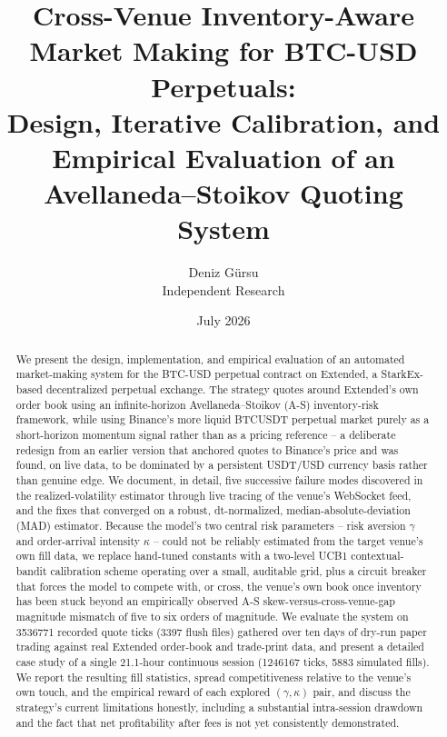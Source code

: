 \documentclass[11pt,a4paper]{article}
\title{\textbf{Cross-Venue Inventory-Aware Market Making for BTC-USD Perpetuals:\\
Design, Iterative Calibration, and Empirical Evaluation of an\\
Avellaneda--Stoikov Quoting System}}
\author{Deniz Gürsu\\
\small Independent Research}
\date{July 2026}
\begin{document}
\maketitle

\begin{abstract}
We present the design, implementation, and empirical evaluation of an automated market-making
system for the BTC-USD perpetual contract on Extended, a StarkEx-based decentralized perpetual
exchange. The strategy quotes around Extended's own order book using an infinite-horizon
Avellaneda--Stoikov (A-S) inventory-risk framework, while using Binance's more liquid BTCUSDT
perpetual market purely as a short-horizon momentum signal rather than as a pricing reference --
a deliberate redesign from an earlier version that anchored quotes to Binance's price and was
found, on live data, to be dominated by a persistent USDT/USD currency basis rather than genuine
edge. We document, in detail, five successive failure modes discovered in the realized-volatility
estimator through live tracing of the venue's WebSocket feed, and the fixes that converged on a
robust, dt-normalized, median-absolute-deviation (MAD) estimator. Because the model's two central
risk parameters -- risk aversion $\gamma$ and order-arrival intensity $\kappa$ -- could not be
reliably estimated from the target venue's own fill data, we replace hand-tuned constants with a
two-level UCB1 contextual-bandit calibration scheme operating over a small, auditable grid, plus
a circuit breaker that forces the model to compete with, or cross, the venue's own book once
inventory has been stuck beyond an empirically observed A-S skew-versus-cross-venue-gap
magnitude mismatch of five to six orders of magnitude. We evaluate the system on
\num{3536771} recorded quote ticks (\num{3397} flush files) gathered over ten days of dry-run
paper trading against real Extended order-book and trade-print data, and present a detailed
case study of a single \num{21.1}-hour continuous session (\num{1246167} ticks,
\num{5883} simulated fills). We report the resulting fill statistics, spread competitiveness
relative to the venue's own touch, and the empirical reward of each explored $(\gamma,\kappa)$
pair, and discuss the strategy's current limitations honestly, including a substantial
intra-session drawdown and the fact that net profitability after fees is not yet consistently
demonstrated.
\end{abstract}

\tableofcontents

\end{document}
